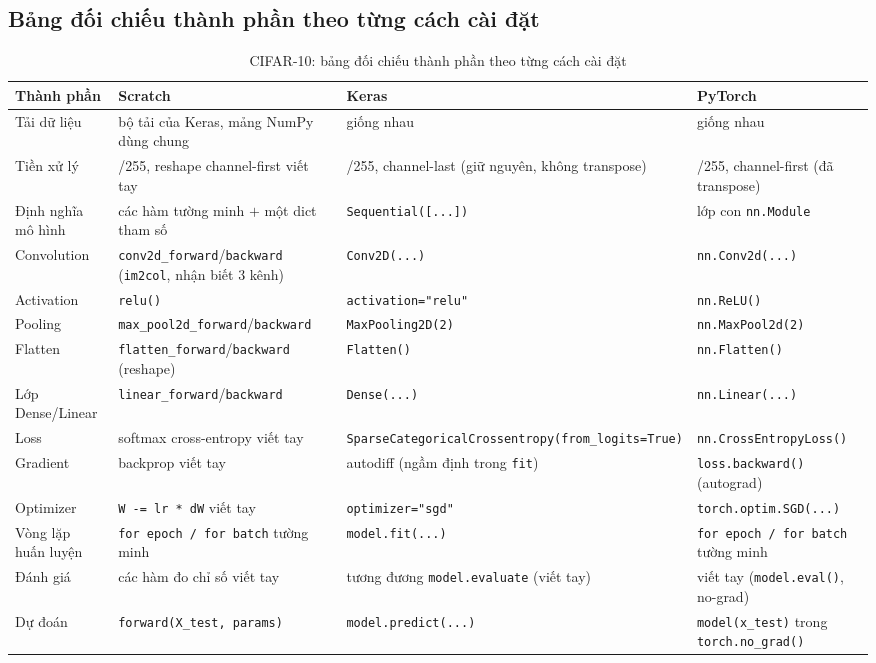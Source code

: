 \documentclass[11pt]{article}
\newcommand{\code}[1]{\texttt{#1}}
\begin{document}
\subsection{Bảng đối chiếu thành phần theo từng cách cài đặt}

\begin{table}[H]
\centering
\caption{CIFAR-10: bảng đối chiếu thành phần theo từng cách cài đặt}
\footnotesize
\begin{tabular}{@{}p{2.5cm}p{4.1cm}p{4.1cm}p{4.1cm}@{}}
\toprule
Thành phần & Scratch & Keras & PyTorch \\
\midrule
Tải dữ liệu & bộ tải của Keras, mảng NumPy dùng chung & giống nhau & giống nhau \\
Tiền xử lý & /255, reshape channel-first viết tay & /255, channel-last (giữ nguyên, không transpose) & /255, channel-first (đã transpose) \\
Định nghĩa mô hình & các hàm tường minh $+$ một dict tham số & \code{Sequential([...])} & lớp con \code{nn.Module} \\
Convolution & \code{conv2d\_forward}/\code{backward} (\code{im2col}, nhận biết 3 kênh) & \code{Conv2D(...)} & \code{nn.Conv2d(...)} \\
Activation & \code{relu()} & \code{activation="relu"} & \code{nn.ReLU()} \\
Pooling & \code{max\_pool2d\_forward}/\code{backward} & \code{MaxPooling2D(2)} & \code{nn.MaxPool2d(2)} \\
Flatten & \code{flatten\_forward}/\code{backward} (reshape) & \code{Flatten()} & \code{nn.Flatten()} \\
Lớp Dense/Linear & \code{linear\_forward}/\code{backward} & \code{Dense(...)} & \code{nn.Linear(...)} \\
Loss & softmax cross-entropy viết tay & \code{SparseCategorical}\allowbreak\code{Crossentropy(}\allowbreak\code{from\_logits=True)} & \code{nn.CrossEntropyLoss()} \\
Gradient & backprop viết tay & autodiff (ngầm định trong \code{fit}) & \code{loss.backward()} (autograd) \\
Optimizer & \code{W -= lr * dW} viết tay & \code{optimizer="sgd"} & \code{torch.optim.SGD(...)} \\
Vòng lặp huấn luyện & \code{for epoch / for batch} tường minh & \code{model.fit(...)} & \code{for epoch / for batch} tường minh \\
Đánh giá & các hàm đo chỉ số viết tay & tương đương \code{model.evaluate} (viết tay) & viết tay (\code{model.eval()}, no-grad) \\
Dự đoán & \code{forward(X\_test, params)} & \code{model.predict(...)} & \code{model(x\_test)} trong \code{torch.no\_grad()} \\
\bottomrule
\end{tabular}
\end{table}
\end{document}
